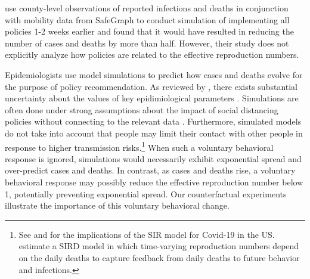 \documentclass[3p, longtitle]{elsarticle}
\theoremstyle{definition}
\begin{document}
 \cite{pei2020} use county-level observations of reported infections and deaths in conjunction with mobility  data from SafeGraph to conduct simulation of implementing all policies 1-2 weeks earlier and found that it would have resulted in reducing the number of cases and deaths by more than half. However, their study does not  explicitly analyze how policies are related to the effective reproduction numbers. %

Epidemiologists use model simulations to predict how cases and deaths evolve for the purpose of policy recommendation. As reviewed by \cite{avery2020}, there exists substantial uncertainty about the values of key epidimiological parameters \citep[see also][]{atkeson2020b,stock2020}. Simulations are often done under strong assumptions about the impact of social distancing policies without connecting to the relevant data  \citep[e.g.,][]{ferguson2020}. Furthermore, simulated models do not take into account that people may limit their contact with other people in response to higher transmission risks.\footnote{See \cite{atkeson2020a} and \cite{stock2020} for the implications of the SIR model for Covid-19 in the US. \cite{NBERw27128} estimate a SIRD model in which time-varying reproduction numbers depend on the daily deaths to capture feedback from daily deaths to future behavior and infections.}  When such a voluntary behavioral response is ignored, simulations would necessarily exhibit exponential spread and over-predict  cases and deaths. In contrast, as cases and deaths rise, a voluntary behavioral response may possibly reduce the effective reproduction number  below 1,  potentially preventing exponential spread. Our counterfactual experiments  illustrate the importance of this voluntary behavioral change.
\end{document}

